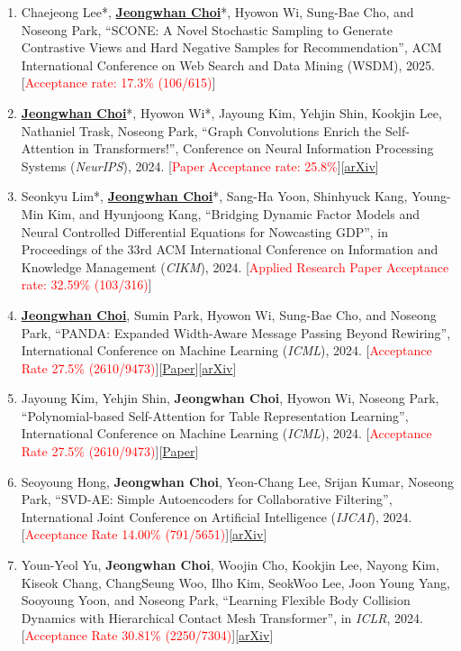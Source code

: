 \documentclass[10pt]{article}
\newenvironment{changemargin}[2]{
  \begin{list}{}{
    \setlength{\topsep}{0pt}
    \setlength{\leftmargin}{#1}
    \setlength{\rightmargin}{#2}
    \setlength{\listparindent}{\parindent}
    \setlength{\itemindent}{\parindent}
    \setlength{\parsep}{\parskip}
  }
  \item[]}{\end{list}
}
\newcommand{\RED}[1]{\textcolor{red}{#1}}
\newcommand{\textbu}[1]{\underline{\textbf{#1}}}
\newenvironment{body} {
	\vspace*{-16pt}
	\begin{changemargin}{-0.25in}{-0.5in}
  }
	{\end{changemargin}
}
\begin{document}
\begin{body}
\begin{enumerate}
    \item Chaejeong Lee*, \textbu{Jeongwhan Choi}*, Hyowon Wi,  Sung-Bae Cho, and Noseong Park, ``SCONE: A Novel Stochastic Sampling to Generate Contrastive Views and Hard Negative Samples for Recommendation'', ACM International Conference on Web Search and Data Mining (WSDM), 2025. [\RED{Acceptance rate: 17.3\% (106/615)}]
    \item \textbu{Jeongwhan Choi}*, Hyowon Wi*, Jayoung Kim, Yehjin Shin, Kookjin Lee, Nathaniel Trask, Noseong Park, ``Graph Convolutions Enrich the Self-Attention in Transformers!'', Conference on Neural Information Processing Systems (\textit{NeurIPS}), 2024. [\RED{Paper Acceptance rate: 25.8\%}][\href{https://arxiv.org/abs/2312.04234}{arXiv}]
    \item Seonkyu Lim*, \textbu{Jeongwhan Choi}*, Sang-Ha Yoon, Shinhyuck Kang, Young-Min Kim, and Hyunjoong Kang, ``Bridging Dynamic Factor Models and Neural Controlled Differential Equations for Nowcasting GDP'', in Proceedings of the 33rd ACM International Conference on Information and Knowledge Management (\textit{CIKM}), 2024. [\RED{Applied Research Paper Acceptance rate: 32.59\% (103/316)}]
    \item \textbu{Jeongwhan Choi}, Sumin Park, Hyowon Wi,  Sung-Bae Cho, and Noseong Park, ``PANDA: Expanded Width-Aware Message Passing Beyond Rewiring'', International Conference on Machine Learning (\textit{ICML}), 2024. [\RED{Acceptance Rate 27.5\% (2610/9473)}][\href{https://proceedings.mlr.press/v235/choi24f.html}{Paper}][\href{https://arxiv.org/abs/2406.03671}{arXiv}]
    \item Jayoung Kim, Yehjin Shin, \textbf{Jeongwhan Choi}, Hyowon Wi, Noseong Park, ``Polynomial-based Self-Attention for Table Representation Learning'', International Conference on Machine Learning (\textit{ICML}), 2024. [\RED{Acceptance Rate 27.5\% (2610/9473)}][\href{https://proceedings.mlr.press/v235/kim24ae.html}{Paper}]
    \item Seoyoung Hong, \textbf{Jeongwhan Choi}, Yeon-Chang Lee, Srijan Kumar, Noseong Park, ``SVD-AE: Simple Autoencoders for Collaborative Filtering'', International Joint Conference on Artificial Intelligence (\textit{IJCAI}), 2024. [\RED{Acceptance Rate 14.00\% (791/5651)}][\href{https://arxiv.org/abs/2405.04746}{arXiv}]
    \item Youn-Yeol Yu, \textbf{Jeongwhan Choi}, Woojin Cho, Kookjin Lee, Nayong Kim, Kiseok Chang, ChangSeung Woo, Ilho Kim, SeokWoo Lee, Joon Young Yang, Sooyoung Yoon, and Noseong Park, ``Learning Flexible Body Collision Dynamics with Hierarchical Contact Mesh Transformer'',  in \textit{ICLR}, 2024. [\RED{Acceptance Rate  30.81\% (2250/7304)}][\href{https://arxiv.org/abs/2312.12467}{arXiv}]

\end{enumerate}
\end{body}
\end{document}
